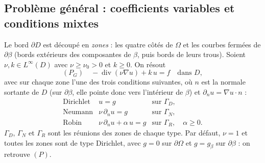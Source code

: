 \documentclass[11pt,a4paper]{article}
\begin{document}
\subsection{Problème général : coefficients variables et conditions mixtes}
\label{sec:general}

Le bord $\partial D$ est découpé en \emph{zones} : les quatre côtés de
$\Omega$ et les courbes fermées de $\partial\beta$ (bords extérieurs des
composantes de $\beta$, puis bords de leurs trous). Soient
$\nu, k \in L^\infty(D)$ avec $\nu \ge \nu_0 > 0$ et $k \ge 0$. On résout
\[
(P_G)\quad -\operatorname{div}(\nu \nabla u) + k\, u = f \quad \text{dans } D,
\]
avec sur chaque zone l'une des trois conditions suivantes, où $n$ est la
normale sortante de $D$ (sur $\partial\beta$, elle pointe donc vers
l'intérieur de $\beta$) et $\partial_n u = \nabla u \cdot n$ :
\[
\begin{array}{lll}
\text{Dirichlet} & u = g & \text{sur } \Gamma_D,\\[2pt]
\text{Neumann}   & \nu\, \partial_n u = g & \text{sur } \Gamma_N,\\[2pt]
\text{Robin}     & \nu\, \partial_n u + \alpha\, u = g & \text{sur } \Gamma_R,
\quad \alpha \ge 0 .
\end{array}
\]
$\Gamma_D$, $\Gamma_N$ et $\Gamma_R$ sont les réunions des zones de chaque
type. Par défaut, $\nu = 1$ et toutes les zones sont de type Dirichlet, avec
$g = 0$ sur $\partial\Omega$ et $g = g_\beta$ sur $\partial\beta$ : on
retrouve $(P)$.
\end{document}
